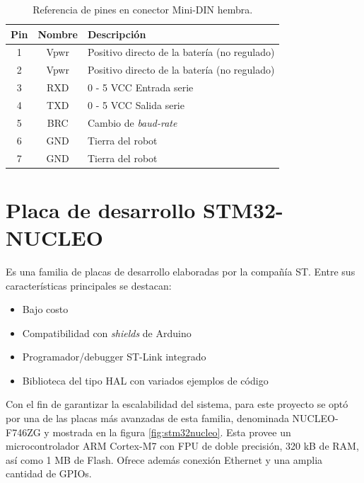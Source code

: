 \begin{table}[h]
    \centering
    \caption{Referencia de pines en conector Mini-DIN hembra.}
    \label{tab:Pines}
    \begin{tabular}{ccl}
        \toprule
        \textbf{Pin} & \textbf{Nombre} & \textbf{Descripción}                         \\
        \midrule
        1            & Vpwr            & Positivo directo de la batería (no regulado) \\
        2            & Vpwr            & Positivo directo de la batería (no regulado) \\
        3            & RXD             & 0 - 5 VCC Entrada serie                      \\
        4            & TXD             & 0 - 5 VCC Salida serie                       \\
        5            & BRC             & Cambio de \textit{baud-rate}                 \\
        6            & GND             & Tierra del robot                             \\
        7            & GND             & Tierra del robot                             \\
        \bottomrule
        \hline
    \end{tabular}
    \label{tab:distribucionPines}
\end{table}

\section{Placa de desarrollo STM32-NUCLEO}

Es una familia de placas de desarrollo elaboradas por la compañía ST. Entre sus características principales se destacan:

\begin{itemize}
    \item Bajo costo
    \item Compatibilidad con \textit{shields} de Arduino
    \item Programador/debugger ST-Link integrado
    \item Biblioteca del tipo HAL con variados ejemplos de código
\end{itemize}

Con el fin de garantizar la escalabilidad del sistema, para este proyecto se optó por una de las placas más avanzadas de esta familia, denominada NUCLEO-F746ZG y mostrada en la figura \ref{fig:stm32nucleo}. Esta provee un microcontrolador ARM Cortex-M7 con FPU de doble precisión, 320 kB de RAM, así como 1 MB de Flash. Ofrece además conexión Ethernet y una amplia cantidad de GPIOs.

